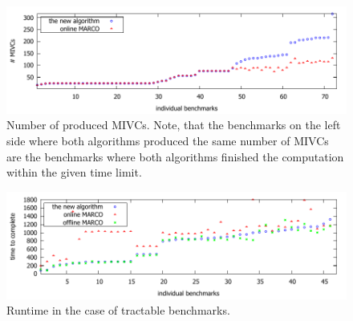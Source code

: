\begin{figure}[!t]
\centering
\includegraphics[scale=0.8]{./plots/found_mivcs.pdf}
\caption{Number of produced MIVCs. Note, that the benchmarks on the left side where both algorithms produced the same number of MIVCs are the benchmarks where both algorithms finished the computation within the given time limit.}
\label{res:found_mivcs}
\end{figure}

\begin{figure}[!t]
\centering
\includegraphics[scale=0.8]{./plots/time_to_complete.pdf}
\caption{Runtime in the case of tractable benchmarks.}
\label{res:time_to_complete}
\end{figure}


